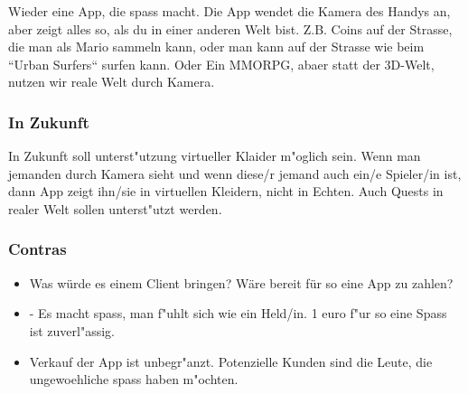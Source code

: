 Wieder eine App, die spass macht. Die App wendet die Kamera des Handys an, aber zeigt alles so, als du in einer anderen Welt bist. Z.B. Coins auf der Strasse, die man als Mario sammeln kann, oder man kann auf der Strasse wie beim ``Urban Surfers`` surfen kann. Oder Ein MMORPG, abaer statt der 3D-Welt, nutzen wir reale Welt durch Kamera.

\subsubsection{In Zukunft} In Zukunft soll unterst"utzung virtueller Klaider m"oglich sein. Wenn man jemanden durch Kamera sieht und wenn diese/r jemand auch ein/e Spieler/in ist, dann App zeigt ihn/sie in virtuellen Kleidern, nicht in Echten. Auch Quests in realer Welt sollen unterst"utzt werden.

\subsubsection{Contras}
\begin{itemize}
\item Was würde es einem Client bringen? Wäre bereit für so eine App zu zahlen?
\item - Es macht spass, man f"uhlt sich wie ein Held/in. 1 euro f"ur so eine Spass ist zuverl"assig.
\item Verkauf der App ist unbegr"anzt. Potenzielle Kunden sind die Leute, die ungewoehliche spass haben m"ochten.
\end{itemize}